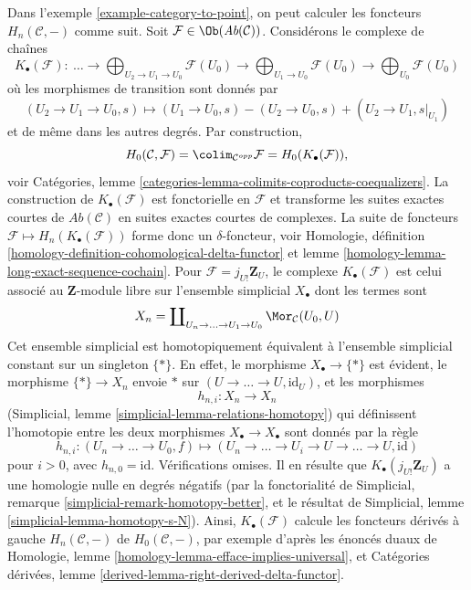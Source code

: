 \begin{example}
\label{example-left-derived-colimits}
Dans l'exemple \ref{example-category-to-point}, on peut calculer les
foncteurs $H_n(\mathcal{C}, -)$ comme suit. Soit
$\mathcal{F} \in \Ob(\textit{Ab}(\mathcal{C}))$. Considérons le complexe de
chaînes
$$
K_\bullet(\mathcal{F}) :
\ \ldots \to
\bigoplus\nolimits_{U_2 \to U_1 \to U_0} \mathcal{F}(U_0)
\to
\bigoplus\nolimits_{U_1 \to U_0} \mathcal{F}(U_0)
\to
\bigoplus\nolimits_{U_0} \mathcal{F}(U_0)
$$
où les morphismes de transition sont donnés par
$$
(U_2 \to U_1 \to U_0, s)
\longmapsto
(U_1 \to U_0, s) - (U_2 \to U_0, s) + (U_2 \to U_1, s|_{U_1})
$$
et de même dans les autres degrés. Par construction,
$$
H_0(\mathcal{C}, \mathcal{F}) =
\colim_{\mathcal{C}^{opp}} \mathcal{F} =
H_0(K_\bullet(\mathcal{F})),
$$
voir Catégories, lemme
\ref{categories-lemma-colimits-coproducts-coequalizers}.
La construction de $K_\bullet(\mathcal{F})$ est fonctorielle en
$\mathcal{F}$ et transforme les suites exactes courtes de
$\textit{Ab}(\mathcal{C})$ en suites exactes courtes de complexes. La suite
de foncteurs $\mathcal{F} \mapsto H_n(K_\bullet(\mathcal{F}))$ forme donc un
$\delta$-foncteur, voir Homologie, définition
\ref{homology-definition-cohomological-delta-functor} et lemme
\ref{homology-lemma-long-exact-sequence-cochain}.
Pour $\mathcal{F} = j_{U!}\mathbf{Z}_U$, le complexe
$K_\bullet(\mathcal{F})$ est celui associé au $\mathbf{Z}$-module libre sur
l'ensemble simplicial $X_\bullet$ dont les termes sont
$$
X_n = \coprod\nolimits_{U_n \to \ldots \to U_1 \to U_0}
\Mor_\mathcal{C}(U_0, U)
$$
Cet ensemble simplicial est homotopiquement équivalent à l'ensemble
simplicial constant sur un singleton $\{*\}$. En effet, le morphisme
$X_\bullet \to \{*\}$ est évident, le morphisme $\{*\} \to X_n$ envoie $*$
sur $(U \to \ldots \to U, \text{id}_U)$, et les morphismes
$$
h_{n, i} : X_n \longrightarrow X_n
$$
(Simplicial, lemme \ref{simplicial-lemma-relations-homotopy})
qui définissent l'homotopie entre les deux morphismes
$X_\bullet \to X_\bullet$ sont donnés par la règle
$$
h_{n, i} :
(U_n \to \ldots \to U_0, f)
\longmapsto
(U_n \to \ldots \to U_i \to U \to \ldots \to U, \text{id})
$$
pour $i > 0$, avec $h_{n, 0} = \text{id}$. Vérifications omises.
Il en résulte que $K_\bullet(j_{U!}\mathbf{Z}_U)$ a une homologie nulle en
degrés négatifs (par la fonctorialité de Simplicial, remarque
\ref{simplicial-remark-homotopy-better}, et le résultat de Simplicial, lemme
\ref{simplicial-lemma-homotopy-s-N}).
Ainsi, $K_\bullet(\mathcal{F})$ calcule les foncteurs dérivés à gauche
$H_n(\mathcal{C}, -)$ de $H_0(\mathcal{C}, -)$, par exemple d'après les
énoncés duaux de Homologie, lemme
\ref{homology-lemma-efface-implies-universal}, et Catégories dérivées, lemme
\ref{derived-lemma-right-derived-delta-functor}.
\end{example}

